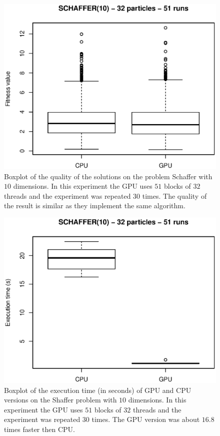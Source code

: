 \documentclass{article}
\begin{document}
    \begin{figure}[!htb]
        \centering
        \includegraphics[width=.7\textwidth]{../img/schaffer10_32particles_fitness.eps}
        \caption{Boxplot of the quality of the solutions on the problem Schaffer with $10$ dimensions. In this experiment the GPU uses $51$ blocks of $32$ threads and the experiment was repeated $30$ times. The quality of the result is similar as they implement the same algorithm.}
        \label{fig:schaffer10_32particles_fitness}
    \end{figure}

    
    \begin{figure}[!htb]
        \centering
        \includegraphics[width=.7\textwidth]{../img/schaffer10_32particles_time.eps}
        \caption{Boxplot of the execution time (in seconds) of GPU and CPU versions on the Shaffer problem with $10$ dimensions. In this experiment the GPU uses $51$ blocks of $32$ threads and the experiment was repeated $30$ times. The GPU version was about $16.8$ times faster then CPU.}
        \label{fig:schaffer10_32particles_time}
    \end{figure}
\end{document}
